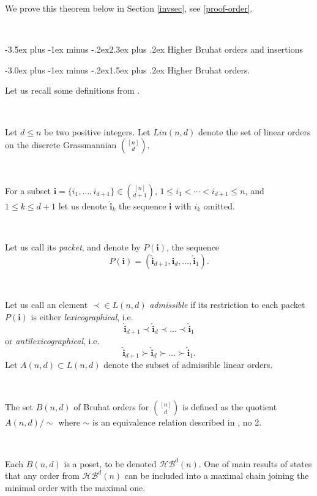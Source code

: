 \documentclass[12pt,a4paper]{article}
\makeatletter
\renewcommand{\section}{\@startsection{section}{1}{0pt}%
{-3.5ex plus -1ex minus -.2ex}{2.3ex plus .2ex}%
{\normalfont\Large}}
\renewcommand{\subsection}{\@startsection{subsection}{2}{0pt}%
{-3.0ex plus -1ex minus -.2ex}{-1.5ex plus .2ex}%
{\normalfont\large\bf}}
\renewcommand{\subsection}{\@startsection{subsection}{2}{0pt}%
{-3.0ex plus -1ex minus -.2ex}{1.5ex plus .2ex}%
{\normalfont\large\bf}}
\def\hat{\widehat}
\renewcommand{\section}{\@startsection{section}{1}{0pt}%
{-3.5ex plus -1ex minus -.2ex}{2.3ex plus .2ex}%
{\normalfont\Large}}
\renewcommand{\subsection}{\@startsection{subsection}{2}{0pt}%
{-3.0ex plus -1ex minus -.2ex}{-1.5ex plus .2ex}%
{\normalfont\normalsize\bf}}
\renewcommand{\subsection}{\@startsection{subsection}{2}{0pt}%
{-3.0ex plus -1ex minus -.2ex}{1.5ex plus .2ex}%
{\normalfont\normalsize\bf}}
\def\hat{\widehat}
\makeatother
\begin{document}
We prove this theorem below in Section \ref{invsec}, see \ref{proof-order}.

\






\section{Higher Bruhat orders and insertions}\label{invsec}

\subsection{Higher Bruhat orders.}\label{def-hbo}

Let us recall some definitions from \cite{MSFA}. 

\

Let $d \leq n$ be two positive integers. Let $Lin(n,d)$ denote the set of linear orders on the discrete Grassmannian ${[n]}\choose d$. 

\ 

For a subset $\mathbf{i} = \{i_1, \ldots, i_{d+1}\}\in {{[n]}\choose d+1}$, 
$1\leq i_1<\cdots < i_{d+1}\leq n$, and $1\leq k\leq d+1$ let us denote $\hat{\mathbf{i}}_k$ 
the sequence $\mathbf{i}$ with $i_k$ omitted. 

\

Let us call its {\it packet}, and denote by $P(\mathbf{i})$, the sequence
\[
P(\mathbf{i}) = (\hat{\mathbf{i}}_{d+1}, \hat{\mathbf{i}}_d, \ldots, \hat{\mathbf{i}}_1).
\]      

\

Let us call an element $\prec\in L(n,d)$ {\it admissible} if 
its restriction to each packet $P(\mathbf{i})$ is 
either {\em lexicographical}, i.e.
\[
\hat{\mathbf{i}}_{d+1}\prec \hat{\mathbf{i}}_d \prec \ldots \prec \hat{\mathbf{i}}_1
\]
or {\em antilexicographical}, i.e.
\[
\hat{\mathbf{i}}_{d+1}\succ \hat{\mathbf{i}}_d \succ \ldots \succ \hat{\mathbf{i}}_1.
\]
Let $A(n,d)\subset L(n,d)$ denote the subset of admissible linear orders. 

\

The set $B(n,d)$ of Bruhat 
orders for ${[n]}\choose d$  is defined as the quotient $A(n,d)/\sim$ where $\sim$ is an equivalence relation described in 
\cite{MSFA}, no 2.

\

Each $B(n,d)$ is a poset, to be denoted $\mathcal{HB}^d(n)$. One of main results of  \cite{MSFA} states that any order from $\mathcal{HB}^d(n)$ can be included into a maximal chain joining the minimal order with the maximal one. 
\end{document}
